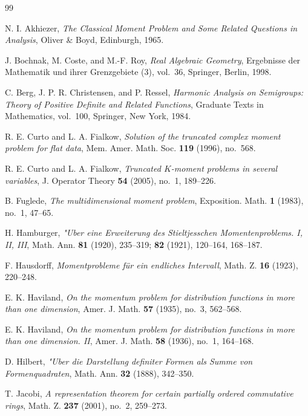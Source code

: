 \documentclass[11pt]{amsart}
\numberwithin{equation}{section}
\theoremstyle{definition}
\theoremstyle{remark}
\newcommand{\1}{\mathbf{1}}
\begin{document}
\begin{thebibliography}{99}

N. I. Akhiezer,
\emph{The Classical Moment Problem and Some Related Questions in Analysis},
Oliver \& Boyd, Edinburgh, 1965.

J. Bochnak, M. Coste, and M.-F. Roy,
\emph{Real Algebraic Geometry},
Ergebnisse der Mathematik und ihrer Grenzgebiete (3), vol.~36,
Springer, Berlin, 1998.

C. Berg, J. P. R. Christensen, and P. Ressel,
\emph{Harmonic Analysis on Semigroups: Theory of Positive Definite and Related Functions},
Graduate Texts in Mathematics, vol.~100,
Springer, New York, 1984.

R. E. Curto and L. A. Fialkow,
\emph{Solution of the truncated complex moment problem for flat data},
Mem. Amer. Math. Soc. \textbf{119} (1996), no.~568.

R. E. Curto and L. A. Fialkow,
\emph{Truncated $K$-moment problems in several variables},
J. Operator Theory \textbf{54} (2005), no.~1, 189--226.

B. Fuglede,
\emph{The multidimensional moment problem},
Exposition. Math. \textbf{1} (1983), no.~1, 47--65.

H. Hamburger,
\emph{"Uber eine Erweiterung des Stieltjesschen Momentenproblems. I, II, III},
Math. Ann. \textbf{81} (1920), 235--319; \textbf{82} (1921), 120--164, 168--187.

F. Hausdorff,
\emph{Momentprobleme f\"ur ein endliches Intervall},
Math. Z. \textbf{16} (1923), 220--248.

E. K. Haviland,
\emph{On the momentum problem for distribution functions in more than one dimension},
Amer. J. Math. \textbf{57} (1935), no.~3, 562--568.

E. K. Haviland,
\emph{On the momentum problem for distribution functions in more than one dimension. II},
Amer. J. Math. \textbf{58} (1936), no.~1, 164--168.

D. Hilbert,
\emph{"Uber die Darstellung definiter Formen als Summe von Formenquadraten},
Math. Ann. \textbf{32} (1888), 342--350.

T. Jacobi,
\emph{A representation theorem for certain partially ordered commutative rings},
Math. Z. \textbf{237} (2001), no.~2, 259--273.


\end{thebibliography}
\end{document}
